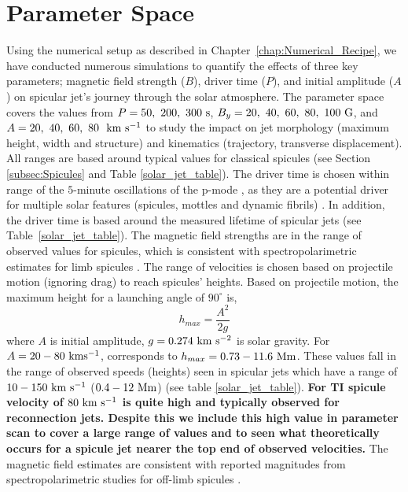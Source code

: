 \section{Parameter Space}
\label{subsec:paramater_space}
Using the numerical setup as described in Chapter~\ref{chap:Numerical_Recipe}, we have conducted numerous simulations to quantify the effects of three key parameters; magnetic field strength ($B$), driver time ($P$), and initial amplitude ($A$) on spicular jet's journey through the solar atmosphere. The parameter space covers the values from $P=50,~200,~300~\rm{s}$, $B_y=20,~40,~60,~80,~100~\rm{G}$, and $A=20,~40,~60,~80~~\rm{km ~s^{-1}}$ to study the impact on jet morphology (maximum height, width and structure) and kinematics (trajectory, transverse displacement). All ranges are based around typical values for classical spicules (see Section \ref{subsec:Spicules} and Table \ref{solar_jet_table}). The driver time is chosen within range of the $5$-minute oscillations of the p-mode \citep{Leighton1962ApJ135474L}, as they are a potential driver for multiple solar features (spicules, mottles  and dynamic fibrils) \citep{Pontieu2004Natur}. In addition, the driver time is based around the measured lifetime of spicular jets (see Table~\ref{solar_jet_table}). The magnetic field strengths are in the range of observed values for spicules, which is consistent with spectropolarimetric estimates for limb spicules \citep{centeno2010, suarez2015}. The range of velocities is chosen based on projectile motion (ignoring drag) to reach spicules' heights. Based on projectile motion, the maximum height for a launching angle of $90^{\circ}$ is,
\begin{equation}
h_{max} = \frac{A^2}{2g}
\end{equation}
where $A$ is initial amplitude, $g=0.274~\rm{km~s^{-2}}$ is solar gravity. For $A=20-80~\rm{km s^{-1}}$, corresponds to $h_{max}=0.73-11.6~\rm{Mm}$. These values fall in the range of observed speeds (heights) seen in spicular jets which have a range of $10-150~\rm{km ~s^{-1}}$ ($0.4-12~\rm{Mm}$) (see table \ref{solar_jet_table}).\textbf{ For TI spicule velocity of $80~\rm{km ~s^{-1}}$ is quite high and typically observed for reconnection jets. Despite this we include this high value in parameter scan to cover a large range of values and to seen what theoretically occurs for a spicule jet nearer the top end of observed velocities.} The magnetic field estimates are consistent with reported magnitudes from spectropolarimetric studies for off-limb spicules \citep{centeno2010, suarez2015}.
